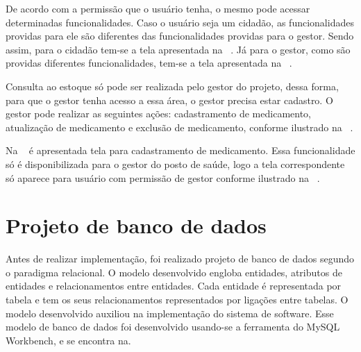 %

De acordo com a permissão que o usuário tenha, o mesmo pode acessar determinadas funcionalidades. Caso o usuário seja um cidadão, as funcionalidades providas para ele são diferentes das funcionalidades providas para o gestor. Sendo assim, para o cidadão tem-se a tela apresentada na ~. Já para o gestor, como são providas diferentes funcionalidades, tem-se a tela apresentada na ~.

%

Consulta ao estoque só pode ser realizada pelo gestor do projeto, dessa forma, para que o gestor tenha acesso a essa área, o gestor precisa estar cadastro. O gestor pode realizar as seguintes ações: cadastramento de medicamento, atualização de medicamento e exclusão de medicamento, conforme ilustrado na ~.


%

Na ~ é apresentada tela para cadastramento de medicamento. Essa funcionalidade só é disponibilizada para o gestor do posto de saúde, logo a tela correspondente só aparece para usuário com permissão de gestor conforme ilustrado na ~. 


\section{Projeto de banco de dados}


Antes de realizar implementação, foi realizado projeto de banco de dados segundo o paradigma relacional. O modelo desenvolvido engloba entidades, atributos de entidades e relacionamentos entre entidades. Cada entidade é representada por tabela e tem os seus relacionamentos representados por ligações entre tabelas. 
O modelo desenvolvido auxiliou na implementação do sistema de software. Esse modelo de banco de dados foi desenvolvido usando-se a ferramenta do MySQL Workbench, e se encontra na.

%
